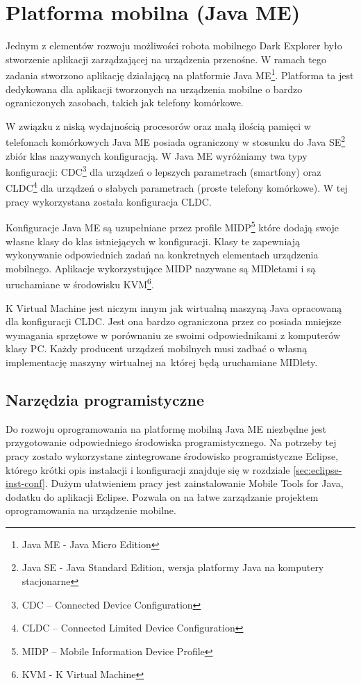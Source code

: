\section{Platforma mobilna (Java ME)}
\label{sec:javame-app}
Jednym z elementów rozwoju możliwości robota mobilnego Dark Explorer było
stworzenie aplikacji zarządzającej na urządzenia przenośne. W ramach tego zadania
stworzono aplikację działającą na platformie Java ME\footnote{Java ME - Java
Micro Edition}. Platforma ta jest dedykowana dla aplikacji tworzonych na
urządzenia mobilne o bardzo ograniczonych zasobach, takich jak telefony
komórkowe.

W związku z niską wydajnością procesorów oraz małą ilością pamięci w telefonach
komórkowych Java ME posiada ograniczony w stosunku do Java SE\footnote{Java SE -
Java Standard Edition, wersja platformy Java na komputery stacjonarne} zbiór klas
nazywanych konfiguracją. W Java ME wyróżniamy twa typy konfiguracji:
CDC\footnote{CDC -- Connected Device Configuration} dla urządzeń o lepszych
parametrach (smartfony) oraz CLDC\footnote{CLDC -- Connected Limited Device
Configuration} dla urządzeń o słabych parametrach (proste telefony komórkowe). W
tej pracy wykorzystana została konfiguracja CLDC.

Konfiguracje Java ME są uzupełniane przez profile MIDP\footnote{MIDP -- Mobile
Information Device Profile} które dodają swoje własne klasy do klas istniejących
w konfiguracji. Klasy te zapewniają wykonywanie odpowiednich zadań na konkretnych
elementach urządzenia mobilnego. Aplikacje wykorzystujące MIDP nazywane są
MIDletami i są uruchamiane w środowisku KVM\footnote{KVM - K Virtual Machine}.

K Virtual Machine jest niczym innym jak wirtualną maszyną Java opracowaną dla
konfiguracji CLDC. Jest ona bardzo ograniczona przez co posiada mniejsze
wymagania sprzętowe w porównaniu ze swoimi odpowiednikami z komputerów klasy PC.
Każdy producent urządzeń mobilnych musi zadbać o własną implementację maszyny
wirtualnej na~której będą uruchamiane MIDlety.

\subsection{Narzędzia programistyczne}
Do rozwoju oprogramowania na platformę mobilną Java ME niezbędne jest
przygotowanie odpowiedniego środowiska programistycznego. Na potrzeby tej pracy
zostało wykorzystane zintegrowane środowisko programistyczne Eclipse, którego
krótki opis instalacji i konfiguracji znajduje się w rozdziale
\ref{sec:eclipse-inst-conf}. Dużym ułatwieniem pracy jest zainstalowanie Mobile
Tools for Java, dodatku do aplikacji Eclipse. Pozwala on na łatwe zarządzanie
projektem oprogramowania na urządzenie mobilne. 

